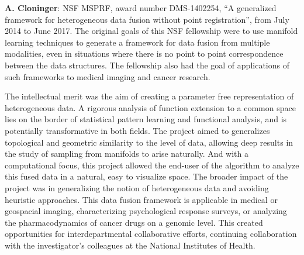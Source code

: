 {\bf A. Cloninger}: NSF MSPRF, award number DMS-1402254, ``A generalized framework for heterogeneous data fusion without point registration'', from July 2014 to June 2017.  
The original goals of this NSF fellowship were to use manifold learning techniques to generate a framework for data fusion from multiple modalities, even in situations where there is no point to point correspondence between the data structures.  The fellowship also had the goal of applications of such frameworks to medical imaging and cancer research.   

The intellectual merit was the aim of creating a parameter free representation of heterogeneous data.  A rigorous analysis of function extension to a common space lies on the border of statistical pattern learning and functional analysis, and is potentially transformative in both fields.  The project aimed to generalizes topological and geometric similarity to the level of data, allowing deep results in the study of sampling from manifolds to arise naturally.  And with a computational focus, this project allowed the end-user of the algorithm to analyze this fused data in a natural, easy to visualize space. 
The broader impact of the project was in generalizing the notion of heterogeneous data and avoiding heuristic approaches.  This data fusion framework is applicable in medical or geospacial imaging, characterizing psychological response surveys, or analyzing the pharmacodynamics of cancer drugs on a genomic level.  This created opportunities for interdepartmental collaborative efforts, continuing collaboration with the investigator's colleagues at the National Institutes of Health.  

